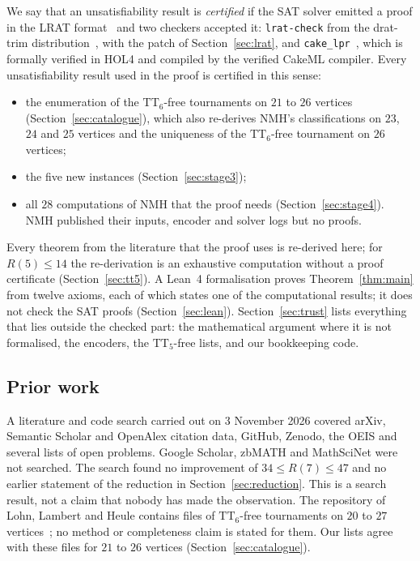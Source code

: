 \documentclass[11pt]{amsart}
\theoremstyle{definition}
\theoremstyle{remark}
\newcommand{\TT}[1]{\mathrm{TT}_{#1}}
\begin{document}
We say that an unsatisfiability result is \emph{certified} if the SAT solver
emitted a proof in the LRAT format~\cite{CHHKS17} and two checkers accepted
it: \texttt{lrat-check} from the drat-trim distribution~\cite{WHH14}, with
the patch of Section~\ref{sec:lrat}, and \texttt{cake\_lpr}~\cite{THM21},
which is formally verified in HOL4 and compiled by the verified CakeML
compiler. Every unsatisfiability result used in the proof is certified in
this sense:
\begin{itemize}
\item the enumeration of the $\TT{6}$-free tournaments on $21$ to $26$
  vertices (Section~\ref{sec:catalogue}), which also re-derives NMH's
  classifications on $23$, $24$ and $25$ vertices and the uniqueness of the
  $\TT{6}$-free tournament on $26$ vertices;
\item the five new instances (Section~\ref{sec:stage3});
\item all $28$ computations of NMH that the proof needs
  (Section~\ref{sec:stage4}). NMH published their inputs, encoder and solver
  logs but no proofs.
\end{itemize}
Every theorem from the literature that the proof uses is re-derived here; for
$R(5) \le 14$ the re-derivation is an exhaustive computation without a proof
certificate (Section~\ref{sec:tt5}). A Lean~4 formalisation proves
Theorem~\ref{thm:main} from twelve axioms, each of which states one of the
computational results; it does not check the SAT proofs
(Section~\ref{sec:lean}). Section~\ref{sec:trust} lists everything that
lies outside the checked part: the mathematical argument where it is not
formalised, the encoders, the $\TT{5}$-free lists, and our bookkeeping code.

\subsection*{Prior work}
A literature and code search carried out on 3 November 2026 covered arXiv,
Semantic Scholar and OpenAlex citation data, GitHub, Zenodo, the OEIS and
several lists of open problems. Google Scholar, zbMATH and MathSciNet were
not searched. The search found no improvement of $34 \le R(7) \le 47$ and no
earlier statement of the reduction in Section~\ref{sec:reduction}. This is
a search result, not a claim that nobody has made the observation. The
repository of Lohn, Lambert and Heule contains files of $\TT{6}$-free
tournaments on $20$ to $27$ vertices~\cite{LLHrepo}; no method or
completeness claim is stated for them. Our lists agree with these files for
$21$ to $26$ vertices (Section~\ref{sec:catalogue}).
\end{document}
